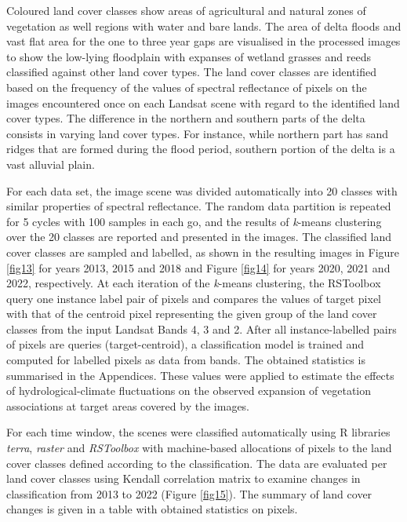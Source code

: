 \documentclass[12pt,a4paper,oneside]{article}
\def \newpar{\vspace{6pt}}
\begin{document}
\newpar Coloured land cover classes show areas of agricultural and natural zones of vegetation as well regions with water and bare lands. The area of delta floods and vast flat area for the one to three year gaps are visualised in the processed images to show the low-lying floodplain with expanses of wetland grasses and reeds classified against other land cover types. The land cover classes are identified based on the frequency of the values of spectral reflectance of pixels on the images encountered once on each Landsat scene with regard to the identified land cover types. The difference in the northern and southern parts of the delta consists in varying land cover types. For instance, while northern part has sand ridges that are formed during the flood period, southern portion of the delta is a vast alluvial plain.

\newpar For each data set, the image scene was divided automatically into 20 classes with similar properties of spectral reflectance. The random data partition is repeated for 5 cycles with 100 samples in each go, and the results of \emph{k}-means clustering over the 20 classes are reported and presented in the images. The classified land cover classes are sampled and labelled, as shown in the resulting images in Figure \ref{fig13} for years 2013, 2015 and 2018 and Figure \ref{fig14} for years 2020, 2021 and 2022, respectively. At each iteration of the \emph{k}-means clustering, the RSToolbox query one instance label pair of pixels and compares the values of target pixel with that of the centroid pixel representing the given group of the land cover classes from the input Landsat Bands 4, 3 and 2. After all instance-labelled pairs of pixels are queries (target-centroid), a classification model is trained and computed for labelled pixels as data from bands. The obtained statistics is summarised in the Appendices. These values were applied to estimate the effects of hydrological-climate fluctuations on the observed expansion of vegetation associations at target areas covered by the images. 

\newpar For each time window, the scenes were classified automatically using R libraries \emph{terra}, \emph{raster} and \emph{RSToolbox} with machine-based allocations of pixels to the land cover classes defined according to the classification. The data are evaluated per land cover classes using Kendall correlation matrix to examine changes in classification from 2013 to 2022 (Figure \ref{fig15}). The summary of land cover changes is given in a table with obtained statistics on pixels. 
\end{document}
